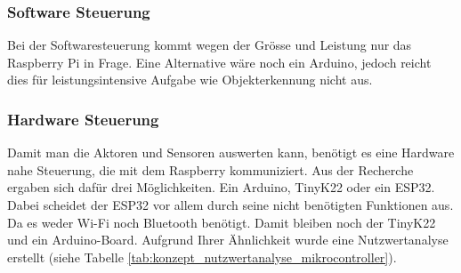 \documentclass[../main.tex]{subfiles}
\begin{document}
\subsubsection{Software Steuerung}

Bei der Softwaresteuerung kommt wegen der Grösse und Leistung nur das Raspberry Pi in Frage.
Eine Alternative wäre noch ein Arduino, jedoch reicht dies für leistungsintensive Aufgabe wie
Objekterkennung nicht aus.

\subsubsection{Hardware Steuerung}
Damit man die Aktoren und Sensoren auswerten kann, benötigt es eine Hardware nahe Steuerung, die mit dem Raspberry kommuniziert. Aus der Recherche ergaben sich dafür drei Möglichkeiten. Ein Arduino, TinyK22 oder ein ESP32. Dabei scheidet der ESP32 vor allem durch seine nicht benötigten Funktionen aus. Da es weder Wi-Fi noch Bluetooth benötigt. Damit bleiben noch der TinyK22 und ein Arduino-Board. Aufgrund Ihrer Ähnlichkeit wurde eine Nutzwertanalyse erstellt (siehe Tabelle \ref{tab:konzept_nutzwertanalyse_mikrocontroller}).
\end{document}
